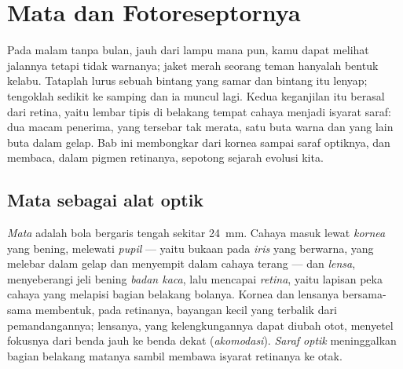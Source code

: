 \chapter{Mata dan Fotoreseptornya}\label{ch:g11:the-eye}

Pada malam tanpa bulan, jauh dari lampu mana pun, kamu dapat melihat
jalannya tetapi tidak warnanya; jaket merah seorang teman hanyalah
bentuk kelabu. Tataplah lurus sebuah bintang yang samar dan bintang itu
lenyap; tengoklah sedikit ke samping dan ia muncul lagi. Kedua keganjilan
itu berasal dari retina, yaitu lembar tipis di belakang  tempat
cahaya menjadi isyarat saraf: dua macam  penerima, yang tersebar tak
merata, satu buta warna dan yang lain buta dalam gelap. Bab ini
membongkar  dari kornea sampai saraf optiknya, dan membaca, dalam
 pigmen retinanya, sepotong sejarah evolusi kita.

\section{Mata sebagai alat optik}

\begin{definition}\label{def:g11:the-eye:parts}
\emph{Mata} adalah bola bergaris tengah sekitar
\qty{24}{mm}. Cahaya masuk lewat \emph{kornea} yang bening, melewati
\emph{pupil} --- yaitu bukaan pada \emph{iris} yang berwarna, yang
melebar dalam gelap dan menyempit dalam cahaya terang --- dan
\emph{lensa}, menyeberangi jeli bening \emph{badan kaca}, lalu mencapai
\emph{retina}, yaitu lapisan peka cahaya yang melapisi bagian belakang
bolanya. Kornea dan lensanya bersama-sama membentuk, pada retinanya,
bayangan kecil yang terbalik dari pemandangannya; lensanya, yang
kelengkungannya dapat diubah otot, menyetel fokusnya dari benda jauh ke
benda dekat (\emph{akomodasi}). \emph{Saraf optik} meninggalkan bagian
belakang matanya sambil membawa isyarat retinanya ke otak.
\end{definition}

